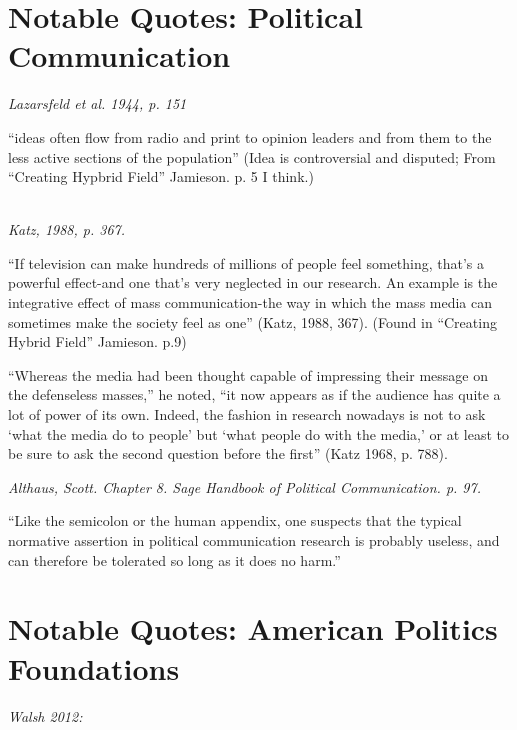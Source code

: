 \documentclass[12pt]{article}
\begin{document}
\setlength{\parindent}{0pt}
\setcounter{page}{1}
\singlespacing 

\section*{Notable Quotes: Political Communication}

\textit{Lazarsfeld et al. 1944, p. 151}

``ideas often flow from radio and print to opinion leaders and from them to the less active sections of the population'' (Idea is controversial and disputed; From ``Creating Hypbrid Field'' Jamieson. p. 5 I think.)

\hfill \\
\noindent \textit{Katz, 1988, p. 367.}

``If television can make hundreds of millions of people feel something, that's a powerful effect-and one that's very neglected in our research. An example is the integrative effect of mass communication-the way in which the mass media can sometimes make the society feel as one'' (Katz, 1988, 367). (Found in ``Creating Hybrid Field'' Jamieson. p.9) 

\hfill 

``Whereas the media had been thought capable of impressing their message on the defenseless masses,'' he noted, ``it now appears as if the audience has quite a lot of power of its own. Indeed, the fashion in research nowadays is not to ask `what the media do to people' but `what people do with the media,' or at least to be sure to ask the second question before the first'' (Katz 1968, p. 788). 

\hfill 

\textit{Althaus, Scott. Chapter 8. Sage Handbook of Political Communication. p. 97.}

``Like the semicolon or the human appendix, one suspects that the typical normative assertion in political communication research is probably useless, and can therefore be tolerated so long as it does no harm.''


\hfill 
\section*{Notable Quotes: American Politics Foundations}

\textit{Walsh 2012:}
\end{document}
